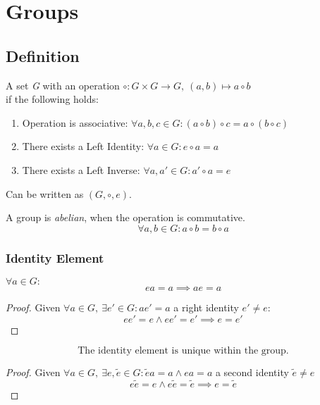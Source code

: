 \section{Groups}

\subsection{Definition}
\begin{definition}[Group]
   A set \textit{G} with an operation \(\circ: G \times G \to G,~(a, b) \mapsto a \circ b\) \\
   if the following holds:
   \begin{enumerate}[label=(\roman*)]
      \item Operation is associative: \(\forall a, b, c \in G: (a \circ b) \circ c = a \circ (b \circ c)\)
      \item There exists a Left Identity: \(\forall a \in G: e \circ a = a\)
      \item There exists a Left Inverse: \(\forall a, a' \in G: a' \circ a = e\)
   \end{enumerate}
   Can be written as \((G, \circ, e)\).
\end{definition}

\begin{definition}\label{def:abel_group}
   A group is \textit{abelian}, when the operation is commutative.
   \[\forall a, b \in G: a \circ b = b \circ a\]
\end{definition}

\subsubsection{Identity Element}
\begin{proposition}[Left Identity = Right Identity]
   \(\forall a \in G:\)
   \[ea = a \implies ae = a\]
\end{proposition}
\begin{proof}
   Given \(\forall a \in G,~\exists e' \in G: ae' = a\) a right identity \(e' \neq e\):
   \[ee' = e \land ee' = e' \implies e = e'\]
\end{proof}

\begin{proposition}[Uniqueness of \(e\)]
   \[\text{The identity element is unique within the group.}\]
\end{proposition}
\begin{proof}
   Given \(\forall a \in G,~\exists e, \tilde{e} \in G: \tilde{e}a = a \land ea = a\) a second identity \(\tilde{e} \neq e\)
   \[e\tilde{e} = e \land e\tilde{e} = \tilde{e} \implies e = \tilde{e}\]
\end{proof}

